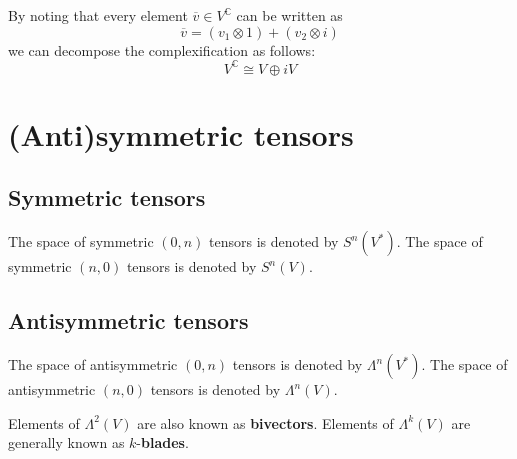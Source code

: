 	\begin{property}
		By noting that every element $\overline{v}\in V^{\mathbb{C}}$ can be written as \[\overline{v} = (v_1\otimes1) + (v_2\otimes i)\] we can decompose the complexification as follows:
		\begin{equation}
			V^{\mathbb{C}} \cong V\oplus iV
		\end{equation}
	\end{property}

\section{(Anti)symmetric tensors}
\subsection{Symmetric tensors}
	\begin{notation}
		The space of symmetric $(0,n)$ tensors is denoted by $S^n(V^*)$. The space of symmetric $(n, 0)$ tensors is denoted by $S^n(V)$.
	\end{notation}
    
\subsection{Antisymmetric tensors}
	\begin{notation}
		\label{tensor:not:antysimmetric_space}
		The space of antisymmetric $(0,n)$ tensors is denoted by $\Lambda^n(V^*)$. The space of antisymmetric $(n, 0)$ tensors is denoted by $\Lambda^n(V)$.
	\end{notation}
    \begin{remark*}
    	Elements of $\Lambda^2(V)$ are also known as \textbf{bivectors}. Elements of $\Lambda^k(V)$ are generally known as $k$-\textbf{blades}.
    \end{remark*}
    
